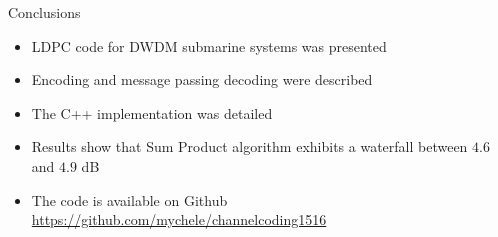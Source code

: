 \documentclass[pdf]
          {beamer}
\begin{document}
\begin{frame}{Conclusions}
    \begin{itemize}
    	\item LDPC code for DWDM submarine systems was presented
 		\item Encoding and message passing decoding were described
 		\item The C++ implementation was detailed
 		\item Results show that Sum Product algorithm exhibits a waterfall between $4.6$ and $4.9$ dB
 		\item The code is available on Github \url{https://github.com/mychele/channelcoding1516}
	\end{itemize}
\end{frame}
\end{document}
